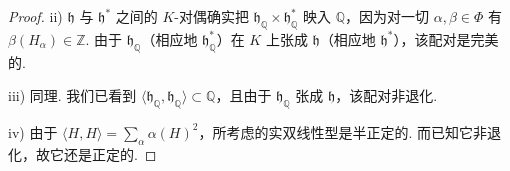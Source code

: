 \begin{numpara}
\begin{proof}
ii) $\mathfrak h$ 与 $\mathfrak h^{*}$ 之间的 $K$-对偶确实把 $\mathfrak h_{\mathbb Q}\times\mathfrak h^{*}_{\mathbb Q}$ 映入 $\mathbb Q$，因为对一切 $\alpha,\beta\in\Phi$ 有 $\beta(H_\alpha)\in\mathbb Z$. 由于 $\mathfrak h_{\mathbb Q}$（相应地 $\mathfrak h^{*}_{\mathbb Q}$）在 $K$ 上张成 $\mathfrak h$（相应地 $\mathfrak h^{*}$），该配对是完美的.

iii) 同理. 我们已看到 $\langle\mathfrak h_{\mathbb Q},\mathfrak h_{\mathbb Q}\rangle\subset\mathbb Q$，且由于 $\mathfrak h_{\mathbb Q}$ 张成 $\mathfrak h$，该配对非退化.

iv) 由于 $\langle H,H\rangle=\sum_\alpha\alpha(H)^2$，所考虑的实双线性型是半正定的. 而已知它非退化，故它还是正定的.
\end{proof}
\end{numpara}
